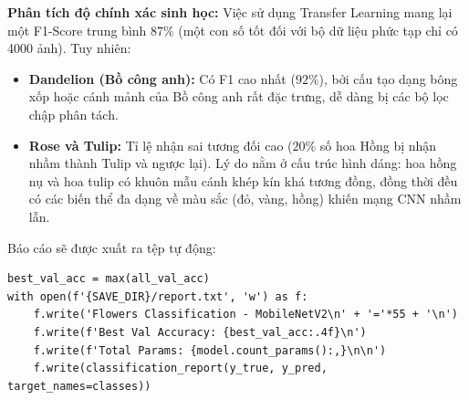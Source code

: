 \textbf{Phân tích độ chính xác sinh học:}
Việc sử dụng Transfer Learning mang lại một F1-Score trung bình $87\%$ (một con số tốt đối với bộ dữ liệu phức tạp chỉ có 4000 ảnh). Tuy nhiên:
\begin{itemize}
    \item \textbf{Dandelion (Bồ công anh):} Có F1 cao nhất ($92\%$), bởi cấu tạo dạng bông xốp hoặc cánh mảnh của Bồ công anh rất đặc trưng, dễ dàng bị các bộ lọc chập phân tách.
    \item \textbf{Rose và Tulip:} Tỉ lệ nhận sai tương đối cao ($20\%$ số hoa Hồng bị nhận nhầm thành Tulip và ngược lại). Lý do nằm ở cấu trúc hình dáng: hoa hồng nụ và hoa tulip có khuôn mẫu cánh khép kín khá tương đồng, đồng thời đều có các biến thể đa dạng về màu sắc (đỏ, vàng, hồng) khiến mạng CNN nhầm lẫn.
\end{itemize}

Báo cáo sẽ được xuất ra tệp tự động:
\begin{lstlisting}[style=pythoncode, caption={Lưu báo cáo vào tập tin hệ thống}]
best_val_acc = max(all_val_acc)
with open(f'{SAVE_DIR}/report.txt', 'w') as f:
    f.write('Flowers Classification - MobileNetV2\n' + '='*55 + '\n')
    f.write(f'Best Val Accuracy: {best_val_acc:.4f}\n')
    f.write(f'Total Params: {model.count_params():,}\n\n')
    f.write(classification_report(y_true, y_pred, target_names=classes))
\end{lstlisting}
